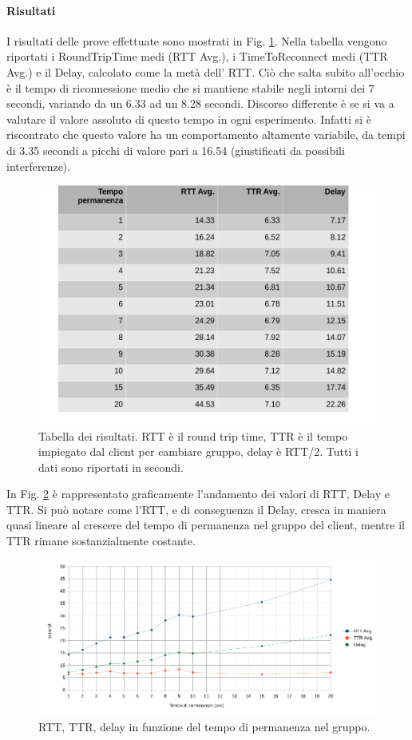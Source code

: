 \documentclass{llncs}
\begin{document}
\paragraph{Risultati} I risultati delle prove effettuate sono mostrati in Fig. \ref{report}. Nella tabella vengono riportati i RoundTripTime medi (RTT Avg.), i TimeToReconnect medi (TTR Avg.) e il Delay, calcolato come la metà dell' RTT. Ciò che salta subito all'occhio è il tempo di riconnessione medio che si mantiene stabile negli intorni dei 7 secondi, variando da un 6.33 ad un 8.28 secondi. Discorso differente è se si va a valutare il valore assoluto di questo tempo in ogni esperimento. Infatti si è riscontrato che questo valore ha un comportamento altamente variabile, da tempi di 3.35 secondi a picchi di valore pari a 16.54 (giustificati da possibili interferenze).
\begin{figure}[H]
	\includegraphics[scale=0.4,center]{img/report.png}
	\caption{Tabella dei risultati. RTT è il round trip time, TTR è il tempo impiegato dal client per cambiare gruppo, delay è RTT/2. Tutti i dati sono riportati in secondi.}
	\label{report}
\end{figure}
\noindent
In Fig. \ref{rtt} è rappresentato graficamente l'andamento dei valori di RTT, Delay e TTR. Si può notare come l'RTT, e di conseguenza il Delay, cresca in maniera quasi lineare al crescere del tempo di permanenza nel gruppo del client, mentre il TTR rimane sostanzialmente costante. 
\begin{figure}[H]
	\includegraphics[scale=0.5,center]{img/rtt.png}
	\caption{RTT, TTR, delay in funzione del tempo di permanenza nel gruppo.}
	\label{rtt}
\end{figure}
\end{document}
